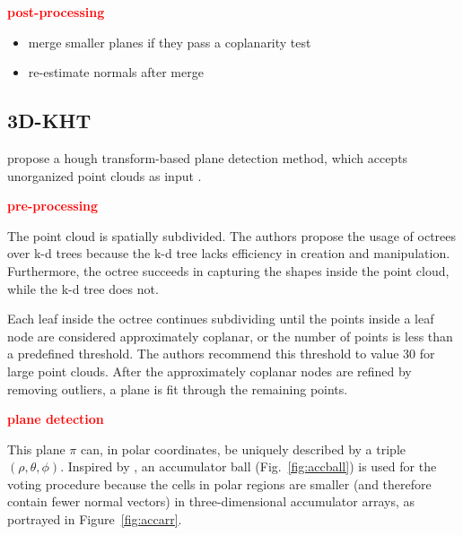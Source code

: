 \documentclass[main.tex]{subfiles}
\begin{document}
\textbf{\textcolor{red}{post-processing}}
\begin{itemize}
    \item merge smaller planes if they pass a coplanarity test
    \item re-estimate normals after merge
\end{itemize}

\subsection{3D-KHT}\label{sub:3dkht}
\citeauthor{Limberger_Oliveira_2015}\cite{Limberger_Oliveira_2015} propose a hough transform-based plane detection method, which accepts unorganized point clouds as input \cite{Limberger_Oliveira_2015}.

\textbf{\textcolor{red}{pre-processing}}

The point cloud is spatially subdivided. The authors propose the usage of octrees over k-d trees because the k-d tree lacks efficiency in creation and manipulation.
Furthermore, the octree succeeds in capturing the shapes inside the point cloud, while the k-d tree does not.

Each leaf inside the octree continues subdividing until the points inside a leaf node are considered approximately coplanar, or the number of points is less than a predefined threshold.
The authors recommend this threshold to value 30 for large point clouds.
After the approximately coplanar nodes are refined by removing outliers, a plane is fit through the remaining points.

\textbf{\textcolor{red}{plane detection}}

This plane $\pi$ can, in polar coordinates, be uniquely described by a triple $(\rho, \theta, \phi)$.
Inspired by \citeauthor{Borrmann_Elseberg_Lingemann_Nüchter_2011}\cite{Borrmann_Elseberg_Lingemann_Nüchter_2011}, an accumulator ball (Fig.~\ref{fig:accball}) is used for the voting procedure because the cells in polar regions are smaller (and therefore
contain fewer normal vectors) in three-dimensional accumulator arrays, as portrayed in Figure~\ref{fig:accarr}.
\end{document}
